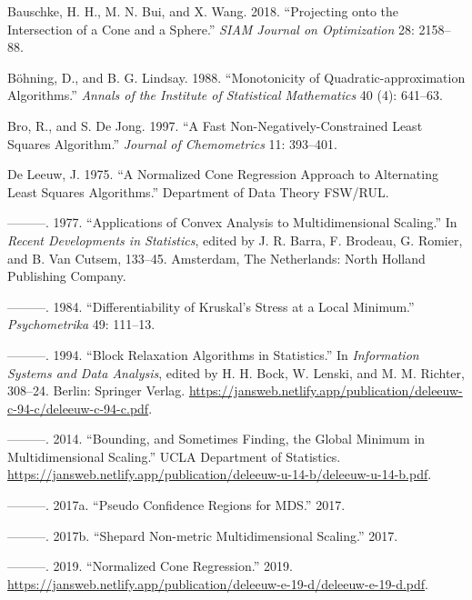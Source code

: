 \documentclass[
  12pt,
]{article}
\newlength{\cslhangindent}
\newenvironment{CSLReferences}[2] %
 {\begin{list}{}{%
  \setlength{\itemindent}{0pt}
  \setlength{\leftmargin}{0pt}
  \setlength{\parsep}{0pt}
  \ifodd #1
   \setlength{\leftmargin}{\cslhangindent}
   \setlength{\itemindent}{-1\cslhangindent}
  \fi
  \setlength{\itemsep}{#2\baselineskip}}}
 {\end{list}}
\begin{document}
\label{refs}
\begin{CSLReferences}{1}{0}
Bauschke, H. H., M. N. Bui, and X. Wang. 2018. {``{Projecting onto the Intersection of a Cone and a Sphere}.''} \emph{SIAM Journal on Optimization} 28: 2158--88.

Böhning, D., and B. G. Lindsay. 1988. {``{Monotonicity of Quadratic-approximation Algorithms}.''} \emph{Annals of the Institute of Statistical Mathematics} 40 (4): 641--63.

Bro, R., and S. De Jong. 1997. {``A Fast Non-Negatively-Constrained Least Squares Algorithm.''} \emph{Journal of Chemometrics} 11: 393--401.

De Leeuw, J. 1975. {``{A Normalized Cone Regression Approach to Alternating Least Squares Algorithms}.''} Department of Data Theory FSW/RUL.

---------. 1977. {``Applications of Convex Analysis to Multidimensional Scaling.''} In \emph{Recent Developments in Statistics}, edited by J. R. Barra, F. Brodeau, G. Romier, and B. Van Cutsem, 133--45. Amsterdam, The Netherlands: North Holland Publishing Company.

---------. 1984. {``{Differentiability of Kruskal's Stress at a Local Minimum}.''} \emph{Psychometrika} 49: 111--13.

---------. 1994. {``{Block Relaxation Algorithms in Statistics}.''} In \emph{Information Systems and Data Analysis}, edited by H. H. Bock, W. Lenski, and M. M. Richter, 308--24. Berlin: Springer Verlag. \url{https://jansweb.netlify.app/publication/deleeuw-c-94-c/deleeuw-c-94-c.pdf}.

---------. 2014. {``{Bounding, and Sometimes Finding, the Global Minimum in Multidimensional Scaling}.''} UCLA Department of Statistics. \url{https://jansweb.netlify.app/publication/deleeuw-u-14-b/deleeuw-u-14-b.pdf}.

---------. 2017a. {``{Pseudo Confidence Regions for MDS}.''} 2017.

---------. 2017b. {``{Shepard Non-metric Multidimensional Scaling}.''} 2017.

---------. 2019. {``Normalized Cone Regression.''} 2019. \url{https://jansweb.netlify.app/publication/deleeuw-e-19-d/deleeuw-e-19-d.pdf}.


\end{CSLReferences}
\end{document}
